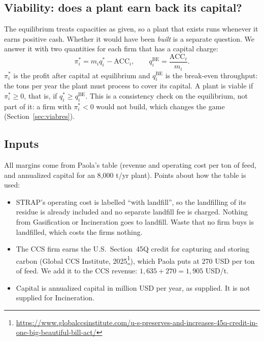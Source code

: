 \documentclass[11pt]{article}
\newcommand{\usd}{USD}
\begin{document}
\subsection{Viability: does a plant earn back its capital?}
\label{sec:viab}

The equilibrium treats capacities as given, so a plant that exists runs whenever it
earns positive cash. Whether it would have been \emph{built} is a separate question.
We answer it with two quantities for each firm that has a capital charge:
\begin{equation}
\pi_i^\ast=m_i q_i^\ast-\mathrm{ACC}_i,
\qquad
q_i^{\mathrm{BE}}=\frac{\mathrm{ACC}_i}{m_i}.
\label{eq:viab}
\end{equation}
$\pi_i^\ast$ is the profit after capital at equilibrium and $q_i^{\mathrm{BE}}$ is the
break-even throughput: the tons per year the plant must process to cover its
capital. A plant is viable if $\pi_i^\ast\ge0$, that is, if $q_i^\ast\ge q_i^{\mathrm{BE}}$.
This is a consistency check on the equilibrium, not part of it: a firm with
$\pi_i^\ast<0$ would not build, which changes the game (Section~\ref{sec:viabres}).

\subsection{Inputs}

All margins come from Paola's table (revenue and operating cost per ton of feed,
and annualized capital for an 8{,}000 t/yr plant). Points about how the table is used:
\begin{itemize}[leftmargin=1.6em,itemsep=0.1em]
  \item STRAP's operating cost is labelled ``with landfill'', so the landfilling of
        its residue is already included and no separate landfill fee is charged.
        Nothing from Gasification or Incineration goes to landfill. Waste that no
        firm buys is landfilled, which costs the firms nothing.
  \item The CCS firm earns the U.S.\ Section~45Q credit for capturing and storing
        carbon (Global CCS Institute, 2025\footnote{\url{https://www.globalccsinstitute.com/u-s-preserves-and-increases-45q-credit-in-one-big-beautiful-bill-act/}}),
        which Paola puts at 270 \usd{} per ton of feed. We add it to the CCS
        revenue: $1{,}635+270=1{,}905$ \usd/t.
  \item Capital is annualized capital in million \usd{} per year, as supplied. It is
        not supplied for Incineration.
\end{itemize}
\end{document}
